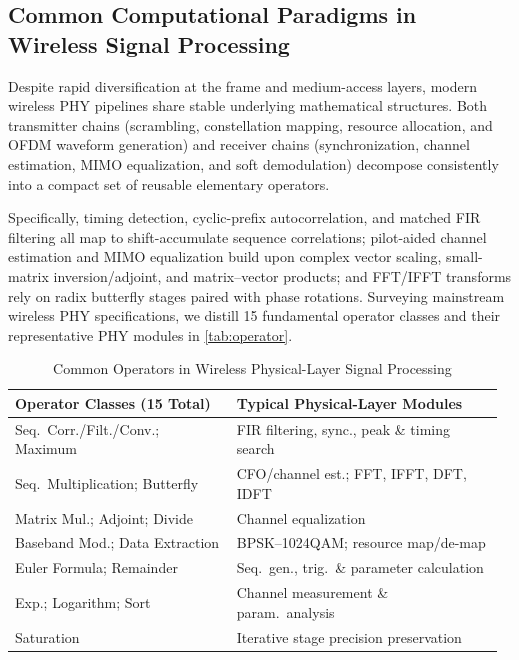 \documentclass[9pt,conference]{IEEEtran}
\begin{document}
\subsection{Common Computational Paradigms in Wireless Signal Processing}

Despite rapid diversification at the frame and medium-access layers, modern wireless PHY pipelines share stable underlying mathematical structures. Both transmitter chains (scrambling, constellation mapping, resource allocation, and OFDM waveform generation) and receiver chains (synchronization, channel estimation, MIMO equalization, and soft demodulation) decompose consistently into a compact set of reusable elementary operators.

Specifically, timing detection, cyclic-prefix autocorrelation, and matched FIR filtering all map to shift-accumulate sequence correlations; pilot-aided channel estimation and MIMO equalization build upon complex vector scaling, small-matrix inversion/adjoint, and matrix--vector products; and FFT/IFFT transforms rely on radix butterfly stages paired with phase rotations. Surveying mainstream wireless PHY specifications, we distill 15 fundamental operator classes and their representative PHY modules in \autoref{tab:operator}.

\begin{table}[t]
\centering
\caption{Common Operators in Wireless Physical-Layer Signal Processing}
\label{tab:operator}
\renewcommand{\arraystretch}{1.12}
\setlength{\tabcolsep}{3.5pt}
\scriptsize
\begin{tabular}{@{}>{\raggedright\arraybackslash}p{0.44\linewidth}>{\raggedright\arraybackslash}p{0.53\linewidth}@{}}
\toprule
\textbf{Operator Classes (15 Total)} & \textbf{Typical Physical-Layer Modules} \\
\midrule
Seq.\ Corr./Filt./Conv.; Maximum & FIR filtering, sync., peak \& timing search \\
Seq.\ Multiplication; Butterfly & CFO/channel est.; FFT, IFFT, DFT, IDFT \\
Matrix Mul.; Adjoint; Divide & Channel equalization \\
Baseband Mod.; Data Extraction & BPSK--1024QAM; resource map/de-map \\
Euler Formula; Remainder & Seq.\ gen., trig.\ \& parameter calculation \\
Exp.; Logarithm; Sort & Channel measurement \& param.\ analysis \\
Saturation & Iterative stage precision preservation \\
\bottomrule
\end{tabular}
\end{table}
\end{document}
